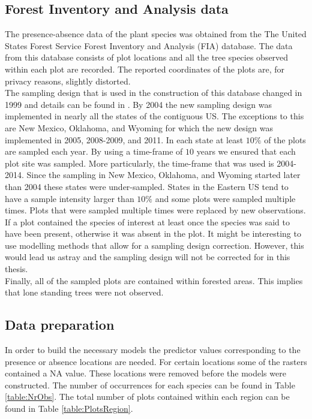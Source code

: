 \subsection{Forest Inventory and Analysis data}
The presence-absence data of the plant species was obtained from the The United States Forest Service Forest Inventory and Analysis (FIA) database. The data from this database consists of plot locations and all the tree species observed within each plot are recorded. The reported coordinates of the plots are, for privacy reasons, slightly distorted.\\ 

The sampling design that is used in the construction of this database changed in 1999 and details can be found in \cite{fiamanual}. By 2004 the new sampling design was implemented in nearly all the states of the contiguous US. The exceptions to this are New Mexico, Oklahoma, and Wyoming for which the new design was implemented in 2005, 2008-2009, and 2011. In each state at least $10\%$ of the plots are sampled each year. By using a time-frame of $10$ years we ensured that each plot site was sampled. More particularly, the time-frame that was used is 2004-2014. Since the sampling in New Mexico, Oklahoma, and Wyoming started later than 2004 these states were under-sampled. States in the Eastern US tend to have a sample intensity larger than $10\%$ and some plots were sampled multiple times. Plots that were sampled multiple times were replaced by new observations. If a plot contained the species of interest at least once the species was said to have been present, otherwise it was absent in the plot. It might be interesting to use modelling methods that allow for a sampling design correction. However, this would lead us astray and the sampling design will not be corrected for in this thesis.\\

Finally, all of the sampled plots are contained within forested areas. This implies that lone standing trees were not observed.

\subsection{Data preparation}
In order to build the necessary models the predictor values corresponding to the presence or absence locations are needed. For certain locations some of the rasters contained a \textsc{NA} value. These locations were removed before the models were constructed. The number of occurrences for each species can be found in Table \ref{table:NrObs}. The total number of plots contained within each region can be found in Table \ref{table:PlotsRegion}.

